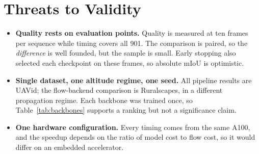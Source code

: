\documentclass[report.tex]{subfiles}
\begin{document}
\section{Threats to Validity}
\label{sec:threats}

\begin{itemize}
    \item \textbf{Quality rests on \NumGT{} evaluation points.} Quality is
          measured at ten frames per sequence while timing covers all 901. The
          comparison is paired, so the \emph{difference} is well founded, but
          the sample is small. Early stopping also selected each checkpoint on
          these frames, so absolute mIoU is optimistic.
    \item \textbf{Single dataset, one altitude regime, one seed.} All pipeline
          results are UAVid; the flow-backend comparison is Ruralscapes, in a
          different propagation regime. Each backbone was trained once, so
          Table~\ref{tab:backbones} supports a ranking but not a significance
          claim.
    \item \textbf{One hardware configuration.} Every timing comes from the
          same A100, and the speedup depends on the ratio of model cost to
          flow cost, so it would differ on an embedded accelerator.
\end{itemize}
\end{document}
